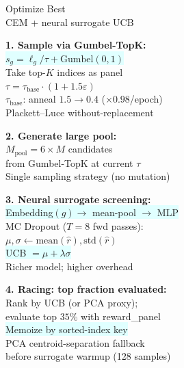 \documentclass[8pt]{article}
\newlength{\colw}
\begin{document}
\begin{minipage}[t]{\colw}
\begin{tcolorbox}[colback=hdrC, colframe=hdrC, fontupper=\bfseries\footnotesize\color{white},
    arc=2pt, left=2pt, right=2pt, top=1pt, bottom=1pt]
\centering Optimize Best\\[-2pt]
{\scriptsize\mdseries CEM + neural surrogate UCB}
\end{tcolorbox}
\vspace{1pt}

\begin{keyboxB}
\textbf{1. Sample via Gumbel-TopK:}\\
\colorbox{lightcyan}{$s_g = \ell_g / \tau + \text{Gumbel}(0,1)$}\\
Take top-$K$ indices as panel\\
$\tau = \tau_\text{base} \cdot (1 + 1.5\varepsilon)$\\
$\tau_\text{base}$: anneal $1.5 \to 0.4$ ($\times 0.98$/epoch)\\
{\scriptsize\color{addedB} Plackett--Luce without-replacement}
\end{keyboxB}\vspace{1pt}

\begin{keyboxB}
\textbf{2. Generate large pool:}\\
$M_\text{pool} = 6\times M$ candidates\\
from Gumbel-TopK at current $\tau$\\
{\scriptsize Single sampling strategy (no mutation)}
\end{keyboxB}\vspace{1pt}

\begin{keyboxB}
\textbf{3. Neural surrogate screening:}\\
\colorbox{lightcyan}{Embedding$(g) \to$ mean-pool $\to$ MLP}\\
MC Dropout ($T{=}8$ fwd passes):\\
$\mu, \sigma \gets \text{mean}(\hat{r}), \text{std}(\hat{r})$\\
\colorbox{lightcyan}{UCB $= \mu + \lambda\sigma$}\\
{\scriptsize\color{addedB} Richer model; higher overhead}
\end{keyboxB}\vspace{1pt}

\begin{keyboxB}
\textbf{4. Racing: top fraction evaluated:}\\
Rank by UCB (or PCA proxy);\\
evaluate top $35\%$ with reward\_panel\\
\colorbox{lightcyan}{Memoize by sorted-index key}\\
{\scriptsize\color{addedB} PCA centroid-separation fallback\\
before surrogate warmup (128 samples)}
\end{keyboxB}\vspace{1pt}


\end{minipage}
\end{document}
